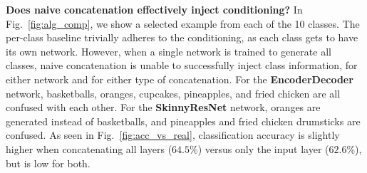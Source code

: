 


\vspace{2mm} \noindent \textbf{Does naive concatenation effectively inject conditioning?} In Fig.~\ref{fig:alg_comp}, we show a selected example from each of the 10 classes. The per-class baseline trivially adheres to the conditioning, as each class gets to have its own network. However, when a single network is trained to generate all classes, naive concatenation is unable to successfully inject class information, for either network and for either type of concatenation. For the \textbf{EncoderDecoder} network, basketballs, oranges, cupcakes, pineapples, and fried chicken are all confused with each other. For the \textbf{SkinnyResNet} network, oranges are generated instead of basketballs, and pineapples and fried chicken drumsticks are confused. As seen in Fig.~\ref{fig:acc_vs_real}, classification accuracy is slightly higher when concatenating all layers ($64.5\%$) versus only the input layer ($62.6\%$), but is low for both.

